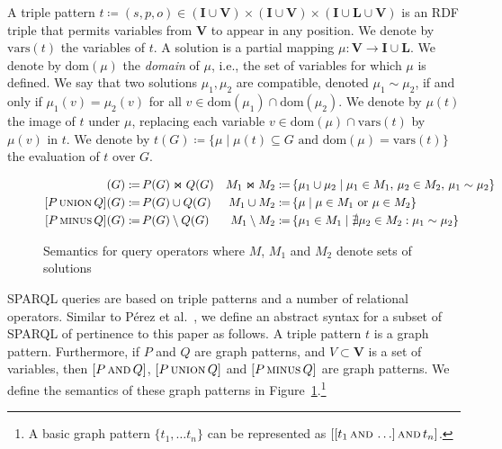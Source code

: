 \documentclass[a4paper]{llncs}
\newcommand{\I}{\ensuremath{\mathbf{I}}\xspace}
\renewcommand{\L}{\ensuremath{\mathbf{L}}\xspace}
\newcommand{\V}{\ensuremath{\mathbf{V}}\xspace}
\newcommand{\ssyn}[3]{[\ensuremath{#1\,\textsc{#2}\,#3}]}
\newcommand{\sand}[2]{\ssyn{#1}{and}{#2}}
\newcommand{\suni}[2]{\ssyn{#1}{union}{#2}}
\newcommand{\sminus}[2]{\ssyn{#1}{minus}{#2}}
\newcommand{\ssel}[2]{\ensuremath{\textsc{select}_{#2}#1}}
\newcommand{\dom}[1]{\ensuremath{\mathrm{dom}(#1)}}
\newcommand{\vars}[1]{\ensuremath{\mathrm{vars}(#1)}}
\newcommand{\com}[2]{\ensuremath{#1 \sim #2}}
\def\ojoin{\setbox0=\hbox{$\bowtie$}%
	\rule[0.18ex]{.25em}{.5pt}\llap{\rule[.9ex]{.25em}{.5pt}}}
\def\loj{\mathbin{\ojoin\mkern-5.8mu\bowtie}}
\newcommand{\da}{\ensuremath{:\nolinebreak\mkern-1.2mu\nolinebreak=}}
\begin{document}
A triple pattern $t \coloneqq (s,p,o) \in (\I \cup \V) \times (\I \cup \V) \times (\I \cup \L \cup \V)$ is an RDF triple that permits variables from $\V$ to appear in any position. We denote by $\vars{t}$ the variables of $t$. A solution is a partial mapping $\mu : \V \rightarrow \I \cup \L$. We denote by $\dom{\mu}$ the \textit{domain} of $\mu$, i.e., the set of variables for which $\mu$ is defined. We say that two solutions $\mu_1, \mu_2$ are compatible, denoted $\mu_1 \sim \mu_2$, if and only if $\mu_1(v) = \mu_2(v)$ for all $v \in \dom{\mu_1} \cap \dom{\mu_2}$. We denote by $\mu(t)$ the image of $t$ under $\mu$, replacing each variable $v \in \dom{\mu} \cap \vars{t}$ by $\mu(v)$ in $t$. We denote by $t(G) \coloneqq \{ \mu \mid \mu(t) \subseteq G\text{ and }\dom{\mu} = \vars{t} \}$ the evaluation of $t$ over $G$.

\begin{figure}[t]
{\footnotesize
\begin{align*}
\sand{P}{Q}(G) \da &\, P(G) \Join Q(G) & M_1 \Join M_2 \da &\, \{ \mu_1 \cup \mu_2 \mid \mu_1 \in M_1,\, \mu_2 \in M_2,\, \com{\mu_1}{\mu_2} \} \\
\suni{P}{Q}(G) \da &\, P(G) \cup Q(G) & M_1 \cup M_2 \da &\, \{ \mu \mid \mu \in M_1\text{ or }\mu \in M_2 \} \\
\sminus{P}{Q}(G) \da &\, P(G) \setminus Q(G) &  M_1 \setminus M_2 \da &\, \{ \mu_1 \in M_1 \mid \nexists \mu_2 \in M_2 : \com{\mu_1}{\mu_2} \} \\
\end{align*}}
\vspace{-1cm}
\caption{Semantics for query operators where $M$, $M_1$ and $M_2$ denote sets of solutions\label{tab:sparql}}
\end{figure}

SPARQL queries are based on triple patterns and a number of relational operators. Similar to Pérez et al.~\cite{PerezAG09}, we define an abstract syntax for a subset of SPARQL of pertinence to this paper as follows. A triple pattern $t$ is a graph pattern. Furthermore, if $P$ and $Q$ are graph patterns, and $V \subset \V$ is a set of variables, then $\sand{P}{Q}$, $\suni{P}{Q}$ and $\sminus{P}{Q}$ are graph patterns. We define the semantics of these graph patterns in Figure~\ref{tab:sparql}.\footnote{A basic graph pattern $\{ t_1, \ldots t_n\}$ can be represented as $\sand{\sand{t_1}{\ldots}}{t_n}$.}
\end{document}
